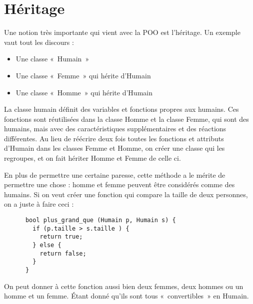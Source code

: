   \section{Héritage}
    Une notion très importante qui vient avec la POO est l'héritage. Un exemple vaut tout les discours :
      \begin{itemize}
        \item Une classe «~Humain~»
        \item Une classe «~Femme~» qui hérite d'Humain
        \item Une classe «~Homme~» qui hérite d'Humain
      \end{itemize}
    
    La classe humain définit des variables et fonctions propres aux humains. Ces fonctions sont réutilisées dans la classe Homme et la classe Femme, qui sont des humains, mais avec des caractéristiques supplémentaires et des réactions différentes. Au lieu de réécrire deux fois toutes les fonctions et attributs d'Humain dans les classes Femme et Homme, on créer une classe qui les regroupes, et on fait hériter Homme et Femme de celle ci.
    
    En plus de permettre une certaine paresse, cette méthode a le mérite de permettre une chose : homme et femme peuvent être considérés comme des humains. Si on veut créer une fonction qui compare la taille de deux 
    personnes, on a juste à faire ceci :
    \begin{lstlisting}
      bool plus_grand_que (Humain p, Humain s) {
        if (p.taille > s.taille ) {
          return true;
        } else {
          return false;
        }
      }
    \end{lstlisting}
    
    On peut donner à cette fonction aussi bien deux femmes, deux hommes ou un homme et un femme. Étant donné qu'ils sont tous «~convertibles~» en Humain.
